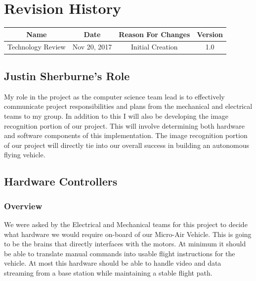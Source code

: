 \documentclass[onecolumn, draftclsnofoot,10pt, compsoc]{IEEEtran}
\begin{document}
\section*{Revision History}

\begin{center}
    \begin{tabular}{|c|c|c|c|}
        \hline
		Name & Date & Reason For Changes & Version\\
        \hline
		Technology Review & Nov 20, 2017 & Initial Creation & 1.0\\
	\hline 
    \end{tabular}
\end{center}


\subsection{Justin Sherburne's Role}

My role in the project as the computer science team lead is to effectively 
communicate project responsibilities and plans from the mechanical and electrical 
teams to my group. In addition to this I will also be developing the image 
recognition portion of our project. This will involve determining both hardware 
and software components of this implementation. The image recognition portion of 
our project will directly tie into our overall success in building an autonomous 
flying vehicle.  

\subsection{Hardware Controllers}

\subsubsection{Overview}

We were asked by the Electrical and Mechanical teams for this 
project to decide what hardware we would require on-board of our 
Micro-Air Vehicle. This is going to be the brains that directly 
interfaces with the motors. At minimum it should be able to 
translate manual commands into usable flight instructions for the 
vehicle. At most this hardware should be able to handle video and 
data streaming from a base station while maintaining a stable 
flight path. 
\end{document}
